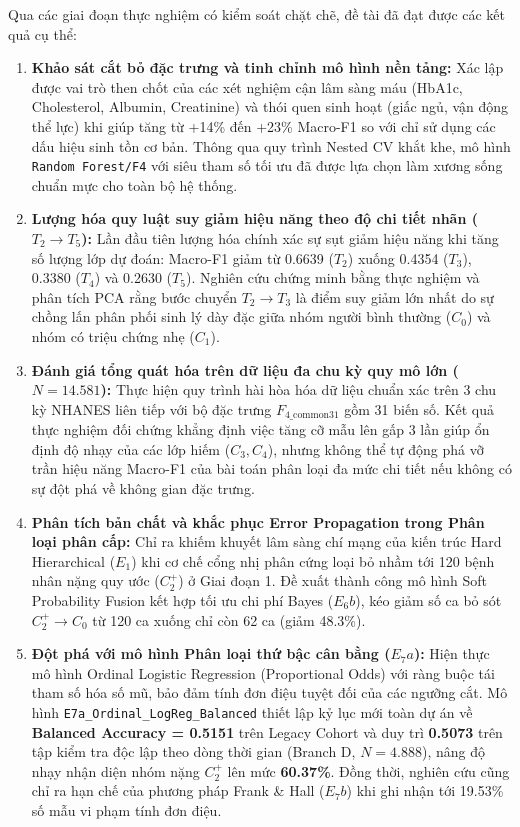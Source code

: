 Qua các giai đoạn thực nghiệm có kiểm soát chặt chẽ, đề tài đã đạt được các kết quả cụ thể:
\begin{enumerate}
    \item \textbf{Khảo sát cắt bỏ đặc trưng và tinh chỉnh mô hình nền tảng:} Xác lập được vai trò then chốt của các xét nghiệm cận lâm sàng máu (HbA1c, Cholesterol, Albumin, Creatinine) và thói quen sinh hoạt (giấc ngủ, vận động thể lực) khi giúp tăng từ +14\% đến +23\% Macro-F1 so với chỉ sử dụng các dấu hiệu sinh tồn cơ bản. Thông qua quy trình Nested CV khắt khe, mô hình \texttt{Random Forest/F4} với siêu tham số tối ưu đã được lựa chọn làm xương sống chuẩn mực cho toàn bộ hệ thống.
    \item \textbf{Lượng hóa quy luật suy giảm hiệu năng theo độ chi tiết nhãn ($T_2 \to T_5$):} Lần đầu tiên lượng hóa chính xác sự sụt giảm hiệu năng khi tăng số lượng lớp dự đoán: Macro-F1 giảm từ 0.6639 ($T_2$) xuống 0.4354 ($T_3$), 0.3380 ($T_4$) và 0.2630 ($T_5$). Nghiên cứu chứng minh bằng thực nghiệm và phân tích PCA rằng bước chuyển $T_2 \to T_3$ là điểm suy giảm lớn nhất do sự chồng lấn phân phối sinh lý dày đặc giữa nhóm người bình thường ($C_0$) và nhóm có triệu chứng nhẹ ($C_1$).
    \item \textbf{Đánh giá tổng quát hóa trên dữ liệu đa chu kỳ quy mô lớn ($N = 14.581$):} Thực hiện quy trình hài hòa hóa dữ liệu chuẩn xác trên 3 chu kỳ NHANES liên tiếp với bộ đặc trưng $F_{4\_\text{common31}}$ gồm 31 biến số. Kết quả thực nghiệm đối chứng khẳng định việc tăng cỡ mẫu lên gấp 3 lần giúp ổn định độ nhạy của các lớp hiếm ($C_3, C_4$), nhưng không thể tự động phá vỡ trần hiệu năng Macro-F1 của bài toán phân loại đa mức chi tiết nếu không có sự đột phá về không gian đặc trưng.
    \item \textbf{Phân tích bản chất và khắc phục Error Propagation trong Phân loại phân cấp:} Chỉ ra khiếm khuyết lâm sàng chí mạng của kiến trúc Hard Hierarchical ($E_1$) khi cơ chế cổng nhị phân cứng loại bỏ nhầm tới 120 bệnh nhân nặng quy ước ($C_2^+$) ở Giai đoạn 1. Đề xuất thành công mô hình Soft Probability Fusion kết hợp tối ưu chi phí Bayes ($E_6b$), kéo giảm số ca bỏ sót $C_2^+ \to C_0$ từ 120 ca xuống chỉ còn 62 ca (giảm 48.3\%).
    \item \textbf{Đột phá với mô hình Phân loại thứ bậc cân bằng ($E_7a$):} Hiện thực mô hình Ordinal Logistic Regression (Proportional Odds) với ràng buộc tái tham số hóa số mũ, bảo đảm tính đơn điệu tuyệt đối của các ngưỡng cắt. Mô hình \texttt{E7a\_Ordinal\_LogReg\_Balanced} thiết lập kỷ lục mới toàn dự án về \textbf{Balanced Accuracy = 0.5151} trên Legacy Cohort và duy trì \textbf{0.5073} trên tập kiểm tra độc lập theo dòng thời gian (Branch D, $N = 4.888$), nâng độ nhạy nhận diện nhóm nặng $C_2^+$ lên mức \textbf{60.37\%}. Đồng thời, nghiên cứu cũng chỉ ra hạn chế của phương pháp Frank \& Hall ($E_7b$) khi ghi nhận tới 19.53\% số mẫu vi phạm tính đơn điệu.
\end{enumerate}

